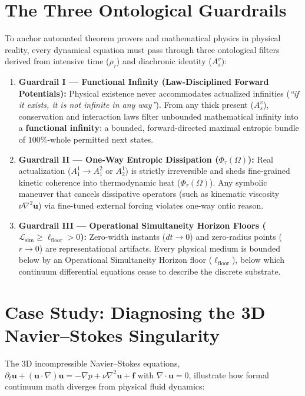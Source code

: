 \documentclass[11pt,a4paper]{article}
\begin{document}
\section{The Three Ontological Guardrails}
To anchor automated theorem provers and mathematical physics in physical reality, every dynamical equation must pass through three ontological filters derived from intensive time ($\rho_\tau$) and diachronic identity ($A_s^v$):
\begin{enumerate}
  \item \textbf{Guardrail I --- Functional Infinity (Law-Disciplined Forward Potentials):} Physical existence never accommodates actualized infinities (\emph{``if it exists, it is not infinite in any way''}). From any thick present ($A_s^v$), conservation and interaction laws filter unbounded mathematical infinity into a \textbf{functional infinity}: a bounded, forward-directed maximal entropic bundle of $100\%$-whole permitted next states.
  \item \textbf{Guardrail II --- One-Way Entropic Dissipation ($\Phi_\tau(\Omega)$):} Real actualization ($A_1^1 \to A_1^2$ or $A_2^1$) is strictly irreversible and sheds fine-grained kinetic coherence into thermodynamic heat ($\Phi_\tau(\Omega)$). Any symbolic maneuver that cancels dissipative operators (such as kinematic viscosity $\nu \nabla^2 \mathbf{u}$) via fine-tuned external forcing violates one-way ontic reason.
  \item \textbf{Guardrail III --- Operational Simultaneity Horizon Floors ($\mathcal{L}_{\text{sim}} \ge \ell_{\text{floor}} > 0$):} Zero-width instants ($dt \to 0$) and zero-radius points ($r \to 0$) are representational artifacts. Every physical medium is bounded below by an Operational Simultaneity Horizon floor ($\ell_{\text{floor}}$), below which continuum differential equations cease to describe the discrete substrate.
\end{enumerate}

\section{Case Study: Diagnosing the 3D Navier--Stokes Singularity}
The 3D incompressible Navier--Stokes equations, $\partial_t \mathbf{u} + (\mathbf{u} \cdot \nabla)\mathbf{u} = -\nabla p + \nu \nabla^2 \mathbf{u} + \mathbf{f}$ with $\nabla \cdot \mathbf{u} = 0$, illustrate how formal continuum math diverges from physical fluid dynamics:
\end{document}
